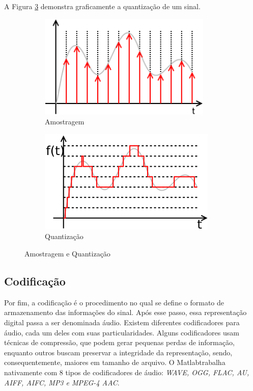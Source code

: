 A Figura \ref{fig-quantizacao} demonstra graficamente a quantização de um sinal.

\begin{figure}[h]
	\begin{subfigure}{0.5\textwidth}
		\centering
		\includegraphics[scale=0.4]{pasta1_figuras/amostragem.png}
		\caption{Amostragem} \label{fig-sampling}
	\end{subfigure}
	\hspace*{\fill} %
	\begin{subfigure}{0.5\textwidth}
		\centering
		\includegraphics[scale=0.75]{pasta1_figuras/quantization.png}
		\caption{Quantização} \label{fig-quantizacao}
	\end{subfigure}
	\caption{Amostragem e Quantização}
\end{figure}

\subsection{Codificação}
Por fim, a codificação é o procedimento no qual se define o formato de armazenamento das informações do sinal. Após esse passo, essa representação digital passa a ser denominada áudio. Existem diferentes codificadores para áudio, cada um deles com suas particularidades. Alguns codificadores usam técnicas de compressão, que podem gerar pequenas perdas de informação, enquanto outros buscam preservar a integridade da representação, sendo, consequentemente, maiores em tamanho de arquivo. O Matlab\rreg trabalha nativamente com 8 tipos de codificadores de áudio: \textit{WAVE, OGG, FLAC, AU, AIFF, AIFC, MP3 e MPEG-4 AAC}\cite{mathworks2018audioread}.



